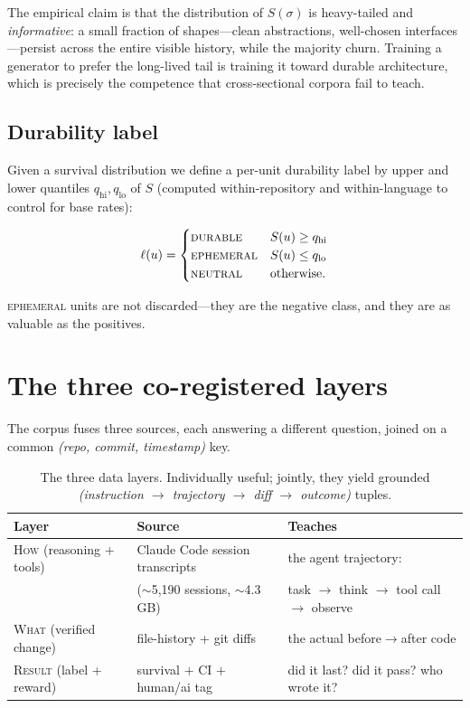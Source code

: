 \documentclass[11pt,letterpaper]{article}
\newcommand{\survival}{\ensuremath{S}}
\newcommand{\shape}{\ensuremath{\sigma}}
\begin{document}
The empirical claim is that the distribution of $\survival(\shape)$ is heavy-tailed
and \emph{informative}: a small fraction of shapes---clean abstractions,
well-chosen interfaces---persist across the entire visible history, while the
majority churn. Training a generator to prefer the long-lived tail is training
it toward durable architecture, which is precisely the competence that
cross-sectional corpora fail to teach.

\subsection{Durability label}

Given a survival distribution we define a per-unit durability label by upper and
lower quantiles $q_{\text{hi}}, q_{\text{lo}}$ of $\survival$ (computed
within-repository and within-language to control for base rates):

\[
\ell(u) =
\begin{cases}
\textsc{durable} & \survival(u) \ge q_{\text{hi}}\\
\textsc{ephemeral} & \survival(u) \le q_{\text{lo}}\\
\textsc{neutral} & \text{otherwise.}
\end{cases}
\]

\textsc{ephemeral} units are not discarded---they are the negative class, and
they are as valuable as the positives.

\section{The three co-registered layers}

The corpus fuses three sources, each answering a different question, joined on a
common \emph{(repo, commit, timestamp)} key.

\begin{table}[h]
\centering
\begin{tabular}{@{}lll@{}}
\toprule
\textbf{Layer} & \textbf{Source} & \textbf{Teaches} \\
\midrule
\textsc{How} (reasoning + tools) & Claude Code session transcripts & the agent trajectory:\\
& ($\sim$5{,}190 sessions, $\sim$4.3\,GB) & task $\to$ think $\to$ tool call $\to$ observe \\[4pt]
\textsc{What} (verified change) & file-history + git diffs & the actual before$\to$after code \\[4pt]
\textsc{Result} (label + reward) & survival $+$ CI $+$ human/ai tag & did it last? did it pass? who wrote it? \\
\bottomrule
\end{tabular}
\caption{The three data layers. Individually useful; jointly, they yield grounded
\textit{(instruction $\to$ trajectory $\to$ diff $\to$ outcome)} tuples.}
\end{table}
\end{document}
